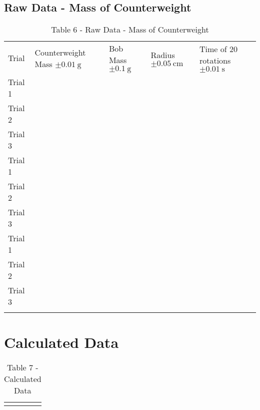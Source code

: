 \documentclass{lab}
\begin{document}
	\noindent\begin{minipage}{\textwidth}
    \subsection{Raw Data - Mass of Counterweight}
    \vspace{-0.2cm}
	\renewcommand{\arraystretch}{1.1}
        \begin{table}[H]
            \centering
            \begin{tabular}{l|llll}
		    	\dtoprule
				Trial		& Counterweight Mass $\pm \SI{0.01}{\gram}$		& Bob Mass $\pm \SI{0.1}{\gram}$		& Radius $\pm \SI{0.05}{\cm}$		& Time of 20 rotations $\pm \SI{0.01}{\second}$	\\
				Trial 1		&&&&\\
				Trial 2		&&&&\\
				Trial 3		&&&&\\
				\hline
				Trial 1		&&&&\\
				Trial 2		&&&&\\
				Trial 3		&&&&\\
				\hline
				Trial 1		&&&&\\
				Trial 2		&&&&\\
				Trial 3		&&&&\\
	    	    \dbottomrule
	    \end{tabular}
	    \caption{Table 6 - Raw Data - Mass of Counterweight}
	    \label{table: raw-data3}
	\end{table}
	\end{minipage}
	\noindent\begin{minipage}{\textwidth}
    \section{Calculated Data}
    \vspace{-0.2cm}
	\renewcommand{\arraystretch}{1.1}
        \begin{table}[H]
            \centering
            \begin{tabular}{l|l|l|l}
				\dtoprule
	    	    \dbottomrule
	    \end{tabular}
	    \caption{Table 7 - Calculated Data}
	    \label{table: calculated-data}
	\end{table}
	\end{minipage}
\end{document}
